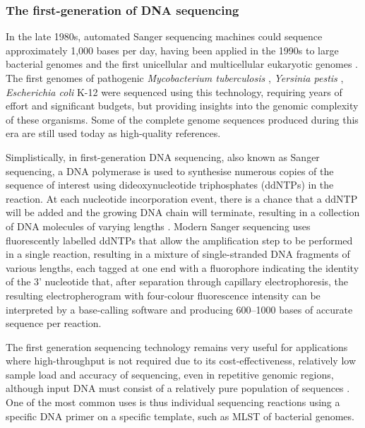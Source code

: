 \subsubsection{The first-generation of DNA sequencing} \label{ssec:_intro_1st_gen_seq}

In the late 1980s, automated Sanger sequencing machines could sequence approximately 1,000 bases per day, having been applied in the 1990s to large bacterial genomes and the first unicellular and multicellular eukaryotic genomes \citep{koch_sequencing_2021}. 
The first genomes of pathogenic \textit{Mycobacterium tuberculosis} \citep{cole_deciphering_1998}, \textit{Yersinia pestis} \citep{parkhill_genome_2001}, \textit{Escherichia coli} K-12 \citep{blattner_complete_1997} were sequenced using this technology, requiring years of effort and significant budgets, but providing insights into the genomic complexity of these organisms. 
Some of the complete genome sequences produced during this era are still used today as high-quality references. 

Simplistically, in first-generation DNA sequencing, also known as Sanger sequencing, a DNA polymerase is used to synthesise numerous copies of the sequence of interest using dideoxynucleotide triphosphates (ddNTPs) in the reaction. 
At each nucleotide incorporation event, there is a chance that a ddNTP will be added and the growing DNA chain will terminate, resulting in a collection of DNA molecules of varying lengths \citep{sanger_dna_1977, hagemann_overview_2015}. 
Modern Sanger sequencing uses fluorescently labelled ddNTPs that allow the amplification step to be performed in a single reaction, resulting in a mixture of single-stranded DNA fragments of various lengths, each tagged at one end with a fluorophore indicating the identity of the 3' nucleotide that, after separation through capillary electrophoresis, the resulting electropherogram with four-colour fluorescence intensity can be interpreted by a base-calling software and producing 600–1000 bases of accurate sequence per reaction\citep{hagemann_overview_2015}. 

The first generation sequencing technology remains very useful for applications where high-throughput is not required due to its cost-effectiveness, relatively low sample load and accuracy of sequencing, even in repetitive genomic regions, although input DNA must consist of a relatively pure population of sequences \citep{slatko_overview_2018}. 
One of the most common uses is thus individual sequencing reactions using a specific DNA primer on a specific template, such as MLST of bacterial genomes. 

